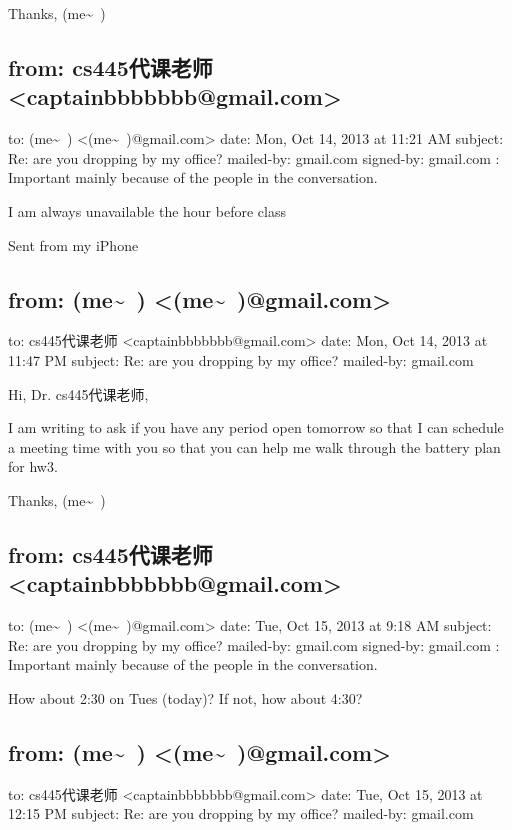 \documentclass[12pt]{book}
\begin{document}
Thanks,
(me\textasciitilde{}~)

\subsection{from:         cs445代课老师 <captainbbbbbbb@gmail.com>}
\label{sec-22-1-5}
to:         (me\textasciitilde{}~) <(me\textasciitilde{}~)@gmail.com>
date:         Mon, Oct 14, 2013 at 11:21 AM
subject:         Re: are you dropping by my office?
mailed-by:         gmail.com
signed-by:         gmail.com
:         Important mainly because of the people in the conversation.

I am always unavailable the hour before class

Sent from my iPhone

\subsection{from:         (me\textasciitilde{}~) <(me\textasciitilde{}~)@gmail.com>}
\label{sec-22-1-6}
to:         cs445代课老师 <captainbbbbbbb@gmail.com>
date:         Mon, Oct 14, 2013 at 11:47 PM
subject:         Re: are you dropping by my office?
mailed-by:         gmail.com

Hi, Dr. cs445代课老师, 

I am writing to ask if you have any period open tomorrow so that I can schedule a meeting time with you so that you can help me walk through the battery plan for hw3. 

Thanks,
(me\textasciitilde{}~)

\subsection{from:         cs445代课老师 <captainbbbbbbb@gmail.com>}
\label{sec-22-1-7}
to:         (me\textasciitilde{}~) <(me\textasciitilde{}~)@gmail.com>
date:         Tue, Oct 15, 2013 at 9:18 AM
subject:         Re: are you dropping by my office?
mailed-by:         gmail.com
signed-by:         gmail.com
:         Important mainly because of the people in the conversation.

How about 2:30 on Tues (today)?
If not, how about 4:30?

\subsection{from:         (me\textasciitilde{}~) <(me\textasciitilde{}~)@gmail.com>}
\label{sec-22-1-8}
to:         cs445代课老师 <captainbbbbbbb@gmail.com>
date:         Tue, Oct 15, 2013 at 12:15 PM
subject:         Re: are you dropping by my office?
mailed-by:         gmail.com
\end{document}
